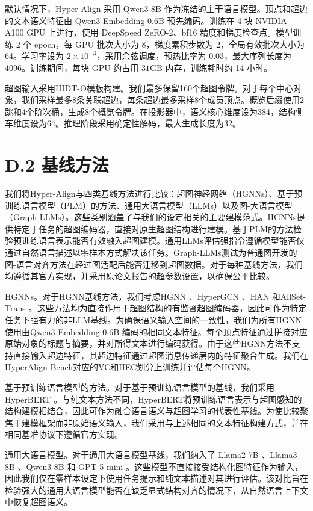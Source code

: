 \documentclass[10pt]{article}
\begin{document}
默认情况下，Hyper-Align 采用 Qwen3-8B 作为冻结的主干语言模型。顶点和超边的文本语义特征由 Qwen3-Embedding-0.6B 预先编码。训练在 4 块 NVIDIA A100 GPU 上进行，使用 DeepSpeed ZeRO-2、bf16 精度和梯度检查点。模型训练 2 个 epoch，每 GPU 批次大小为 8，梯度累积步数为 2，全局有效批次大小为 64。学习率设为 \(2 \times{10}^{-3}\)，采用余弦调度，预热比率为 0.03，最大序列长度为 4096。训练期间，每块 GPU 约占用 \({31}\mathrm{{GB}}\) 内存，训练耗时约 14 小时。

超图输入采用HIDT-O模板构建。我们最多保留160个超图令牌。对于每个中心对象，我们采样最多8条关联超边，每条超边最多采样8个成员顶点。概览后缀使用2跳和4个阶次桶，生成8个概览令牌。在投影器中，语义核心维度设为384，结构侧车维度设为64。推理阶段采用确定性解码，最大生成长度为32。

\section*{D.2 基线方法}

我们将Hyper-Align与四类基线方法进行比较：超图神经网络（HGNNs）、基于预训练语言模型（PLM）的方法、通用大语言模型（LLMs）以及图-大语言模型（Graph-LLMs）。这些类别涵盖了与我们的设定相关的主要建模范式。HGNNs提供特定于任务的超图编码器，直接对原生超图结构进行建模。基于PLM的方法检验预训练语言表示能否有效融入超图建模。通用LLMs评估强指令遵循模型能否仅通过自然语言描述以零样本方式解决该任务。Graph-LLMs测试为普通图开发的图-语言对齐方法在经过图适配后能否迁移到超图数据。对于每种基线方法，我们均遵循其官方实现，并采用原论文报告的超参数设置，以确保公平比较。

HGNNs。对于HGNN基线方法，我们考虑HGNN 、HyperGCN 、HAN 和AllSet-Trans 。这些方法均为直接作用于超图结构的有监督超图编码器，因此可作为特定任务下强有力的非LLM基线。为确保语义输入空间的一致性，我们为所有HGNN使用由Qwen3-Embedding-0.6B 编码的相同文本特征。每个顶点特征通过拼接对应原始对象的标题与摘要，并对所得文本进行编码获得。由于这些HGNN方法不支持直接输入超边特征，其超边特征通过超图消息传递层内的特征聚合生成。我们在HyperAlign-Bench对应的VC和HEC划分上训练并评估每个HGNN。

基于预训练语言模型的方法。对于基于预训练语言模型的基线，我们采用HyperBERT 。与纯文本方法不同，HyperBERT将预训练语言表示与超图感知的结构建模相结合，因此可作为融合语言语义与超图学习的代表性基线。为使比较聚焦于建模框架而非原始语义输入，我们采用与上述相同的文本特征构建方式，并在相同基准协议下遵循官方实现。

通用大语言模型。对于通用大语言模型基线，我们纳入了 Llama2-7B 、Llama3-8B 、Qwen3-8B  和 GPT-5-mini 。这些模型不直接接受结构化图特征作为输入，因此我们仅在零样本设定下使用任务提示和纯文本描述对其进行评估。该对比旨在检验强大的通用大语言模型能否在缺乏显式结构对齐的情况下，从自然语言上下文中恢复超图语义。
\end{document}
